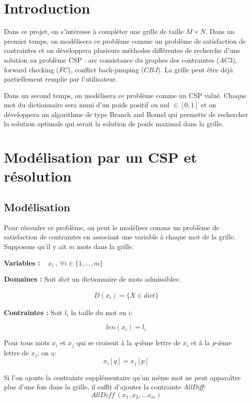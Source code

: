 \documentclass[11pt, letterpaper]{article}
\begin{document}
\section*{Introduction}

Dans ce projet, on s'int\'{e}resse \`{a} compl\'{e}ter une grille de taille $M\times N$. Dans un premier temps, on mod\'{e}lisera ce probl\`{e}me comme un probl\`{e}me de satisfaction de contraintes et on d\'{e}veloppera plusieurs m\'{e}thodes diff\'{e}rentes de recherche d'une solution au probl\`{e}me CSP : arc consistance du graphes des contraintes ($AC3$), forward checking ($FC$), conflict back-jumping ($CBJ$). La grille peut \^{e}tre d\'{e}j\`{a} partiellement remplie par l'utilisateur.

Dans un second temps, on mod\'{e}lisera ce probl\`{e}me comme un CSP valu\'{e}. Chaque mot du dictionnaire sera muni d'un poids positif ou nul $\in \left[0,1\right]$ et on d\'{e}veloppera un algorithme de type Branch and Bound qui permette de rechercher la solution optimale qui serait la solution de poids maximal dans la grille.

\section{Mod\'{e}lisation par un CSP et r\'{e}solution}

\subsection{Mod\'{e}lisation}

Pour r\'{e}soudre ce probl\`{e}me, on peut le mod\'{e}liser comme un probl\`{e}me de satisfaction de contraintes en associant une variable \`{a} chaque mot de la grille. Supposons qu'il y ait $m$ mots dans la grille. \bigskip

\textbf{Variables :} ~ $x_{i}~,~\forall i \in \{1,...,m\}$

\bigskip

\textbf{Domaines :} Soit $dict$ un dictionnaire de mots admissibles:

\begin{align*}
D(x_{i}) = \{ X \in dict \}
\end{align*}

\bigskip

\textbf{Contraintes :} Soit $l_{i}$ la taille du mot en $i$:

\begin{equation} 
len(x_{i}) = l_{i}
\end{equation}
\par
Pour tous mots $x_{i}$ et $x_{j}$ qui se croisent \`{a} la \textit{q}-i\`{e}me lettre de $x_{i}$ et \`{a} la \textit{p}-i\`{e}me lettre de $x_{j}$, on a:
\begin{equation} 
x_{i}[q] = x_{j}[p]
\end{equation}
\par
Si l'on ajoute la contrainte suppl\'{e}mentaire qu'un m\^{e}me mot ne peut appara\^{i}tre plus d'une fois dans la grille, il suffit d'ajouter la contrainte \textit{AllDiff}:
\begin{equation} 
\textit{AllDiff}~(x_{1},x_{2},...x_{m})
\end{equation}
\end{document}
